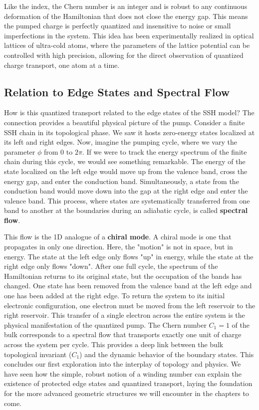 Like the index, the Chern number is an integer and is robust to any continuous deformation of the Hamiltonian that does not close the energy gap.
This means the pumped charge is perfectly quantized and insensitive to noise or small imperfections in the system.
This idea has been experimentally realized in optical lattices of ultra-cold atoms, where the parameters of the lattice potential can be controlled with high precision, allowing for the direct observation of quantized charge transport, one atom at a time.

\subsection{Relation to Edge States and Spectral Flow}
How is this quantized transport related to the edge states of the SSH model?
The connection provides a beautiful physical picture of the pump.
Consider a finite SSH chain in its topological phase.
We saw it hosts zero-energy states localized at its left and right edges.
Now, imagine the pumping cycle, where we vary the parameter $\phi$ from $0$ to $2\pi$.
If we were to track the energy spectrum of the finite chain during this cycle, we would see something remarkable.
The energy of the state localized on the left edge would move up from the valence band, cross the energy gap, and enter the conduction band.
Simultaneously, a state from the conduction band would move down into the gap at the right edge and enter the valence band.
This process, where states are systematically transferred from one band to another at the boundaries during an adiabatic cycle, is called \textbf{spectral flow}.

This flow is the 1D analogue of a \textbf{chiral mode}.
A chiral mode is one that propagates in only one direction.
Here, the "motion" is not in space, but in energy.
The state at the left edge only flows "up" in energy, while the state at the right edge only flows "down".
After one full cycle, the spectrum of the Hamiltonian returns to its original state, but the occupation of the bands has changed.
One state has been removed from the valence band at the left edge and one has been added at the right edge.
To return the system to its initial electronic configuration, one electron must be moved from the left reservoir to the right reservoir.
This transfer of a single electron across the entire system is the physical manifestation of the quantized pump.
The Chern number $C_1=1$ of the bulk corresponds to a spectral flow that transports exactly one unit of charge across the system per cycle.
This provides a deep link between the bulk topological invariant ($C_1$) and the dynamic behavior of the boundary states.
This concludes our first exploration into the interplay of topology and physics.
We have seen how the simple, robust notion of a winding number can explain the existence of protected edge states and quantized transport, laying the foundation for the more advanced geometric structures we will encounter in the chapters to come.
